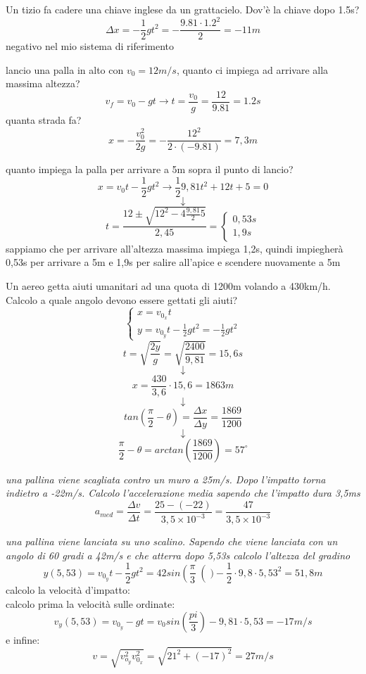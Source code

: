 \documentclass[a4paper,12pt, oneside]{book}
\begin{document}
\begin{esercizio}
Un tizio fa cadere una chiave inglese da un grattacielo. Dov'è la chiave dopo 1.5s?
$$\Delta x= -\frac{1}{2}gt^2=-\frac{9.81\cdot 1.2^2}{2}=-11m$$
negativo nel mio sistema di riferimento 
\end{esercizio}
\begin{esercizio}
lancio una palla in alto con $v_0=12m/s$, quanto ci impiega ad arrivare alla massima altezza?
$$v_f=v_0-gt\to t=\frac{v_0}{g}=\frac{12}{9.81}=1.2s$$
quanta strada fa?
$$x=-\frac{v_0^2}{2g}=-\frac{12^2}{2\cdot (-9.81)}=7,3m$$

quanto impiega la palla per arrivare a 5m sopra il punto di lancio?
$$x=v_0t-\frac{1}{2}gt^2\to \frac{1}{2}9,81t^2+12t+5=0$$
$$\downarrow$$
$$t=\frac{12\pm \sqrt{12^2-4\frac{9,81}{2}5}}{2,45}=\begin{cases}
0,53s\\
1,9s
\end{cases}$$
sappiamo che per arrivare all'altezza massima impiega 1,2s, quindi impiegherà 0,53s per arrivare a 5m e 1,9s per salire all'apice e scendere nuovamente a 5m
\end{esercizio}
\begin{esercizio}
Un aereo getta aiuti umanitari ad una quota di 1200m volando a 430km/h. Calcolo a quale angolo devono essere gettati gli aiuti?
$$
\begin{cases}
x=v_{0_x}t\\
y=v_{0_y}t-\frac{1}{2}gt^2=-\frac{1}{2}gt^2
\end{cases}
$$ 
$$t=\sqrt{\frac{2y}{g}}=\sqrt{\frac{2400}{9,81}}=15,6s$$
$$\downarrow$$
$$x=\frac{430}{3,6}\cdot 15,6=1863m$$
$$\downarrow$$
$$tan(\frac{\pi}{2}-\theta)=\frac{\Delta x}{\Delta y}=\frac{1869}{1200}$$
$$\downarrow$$
$$\frac{\pi}{2}-\theta=arctan\left(\frac{1869}{1200}\right)=57^{\circ}$$
\end{esercizio}
\begin{esercizio}
\textit{una pallina viene scagliata contro un muro a 25m/s. Dopo l'impatto torna indietro a -22m/s. Calcolo l'accelerazione media sapendo che l'impatto dura 3,5ms}
$$a_{med}=\frac{\Delta v}{\Delta t}=\frac{25-(-22)}{3,5\times 10^{-3}}=\frac{47}{3,5\times 10^{-3}}$$
\end{esercizio}
\begin{esercizio}
\textit{una pallina viene lanciata su uno scalino. Sapendo che viene lanciata con un angolo di 60 gradi a 42m/s e che atterra dopo 5,53s calcolo l'altezza del gradino}
$$y(5,53)=v_{0_y}t-\frac{1}{2}gt^2=42sin\left(\frac{\pi}{3}\right()-\frac{1}{2}\cdot 9,8\cdot 5,53^2=51,8m$$
calcolo la velocità d'impatto:\\
calcolo prima la velocità sulle ordinate:
$$v_y(5,53)=v_{0_y}-gt=v_0sin\left(\frac{pi}{3}\right)-9,81\cdot 5,53=-17m/ s$$
e infine:
$$v=\sqrt{v_{o_y}^2
v_{0_x}^2}=\sqrt{21^2+(-17)^2}=27m/ s$$
\end{esercizio}
\end{document}
